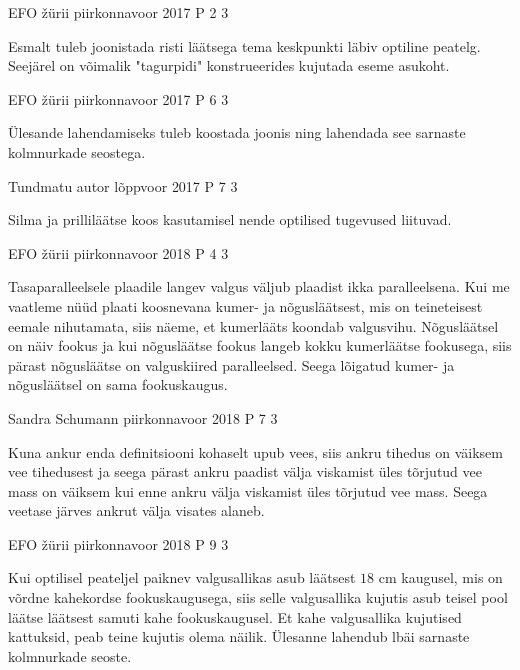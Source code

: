 \documentclass[11pt]{article}
\begin{document}
{%
{EFO žürii} %
{piirkonnavoor} %
{2017} %
{P 2} %
{3} %
{

\ifHint
Esmalt tuleb joonistada risti läätsega tema keskpunkti läbiv optiline peatelg. Seejärel on võimalik "tagurpidi" konstrueerides kujutada eseme asukoht.
\fi
}


{EFO žürii} %
{piirkonnavoor} %
{2017} %
{P 6} %
{3} %
{

\ifHint
Ülesande lahendamiseks tuleb koostada joonis ning lahendada see sarnaste kolmnurkade seostega.
\fi
}

{Tundmatu autor} %
{lõppvoor} %
{2017} %
{P 7} %
{3} %
{

\ifHint
Silma ja prilliläätse koos kasutamisel nende optilised tugevused liituvad.
\fi
}


{EFO žürii} %
{piirkonnavoor} %
{2018} %
{P 4} %
{3} %
{

\ifHint
Tasaparalleelsele plaadile langev valgus väljub plaadist ikka paralleelsena. Kui me vaatleme nüüd plaati koosnevana kumer- ja nõgusläätsest, mis on teineteisest eemale nihutamata, siis näeme, et kumerlääts koondab valgusvihu. Nõgusläätsel on näiv fookus ja kui nõgusläätse fookus langeb kokku kumerläätse fookusega, siis pärast nõgusläätse on valguskiired paralleelsed. Seega lõigatud kumer- ja nõgusläätsel on sama fookuskaugus.
\fi
}


{Sandra Schumann} %
{piirkonnavoor} %
{2018} %
{P 7} %
{3} %
{

\ifHint
Kuna ankur enda definitsiooni kohaselt upub vees, siis ankru tihedus on väiksem vee tihedusest ja seega  pärast ankru paadist välja viskamist üles tõrjutud vee mass on väiksem kui enne ankru välja viskamist üles tõrjutud vee mass. Seega veetase järves ankrut välja visates alaneb.
\fi
}

{EFO žürii} %
{piirkonnavoor} %
{2018} %
{P 9} %
{3} %
{

\ifHint
Kui optilisel peateljel paiknev valgusallikas asub läätsest $18$ cm kaugusel, mis on võrdne kahekordse fookuskaugusega, siis selle valgusallika kujutis asub teisel pool läätse läätsest samuti kahe fookuskaugusel. Et kahe valgusallika kujutised kattuksid, peab teine kujutis olema näilik. Ülesanne lahendub lbäi sarnaste kolmnurkade seoste.
\fi
}


}
\end{document}
